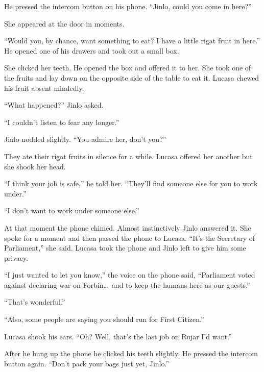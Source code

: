 He pressed the intercom button on his phone. ``Jinlo, could you come in here?''

She appeared at the door in moments.

``Would you, by chance, want something to eat? I have a little rigat fruit in here.'' He opened
one of his drawers and took out a small box.

She clicked her teeth. He opened the box and offered it to her. She took one of the fruits and
lay down on the opposite side of the table to eat it. Lucasa chewed his fruit absent mindedly.

``What happened?'' Jinlo asked.

``I couldn't listen to fear any longer.''

Jinlo nodded slightly. ``You admire her, don't you?''

They ate their rigat fruits in silence for a while. Lucasa offered her another but she shook her
head.

``I think your job is safe,'' he told her. ``They'll find someone else for you to work under.''

``I don't want to work under someone else.''

At that moment the phone chimed. Almost instinctively Jinlo answered it. She spoke for a moment
and then passed the phone to Lucasa. ``It's the Secretary of Parliament,'' she said. Lucasa took
the phone and Jinlo left to give him some privacy.

``I just wanted to let you know,'' the voice on the phone said, ``Parliament voted against
declaring war on Forbin\ldots\ and to keep the humans here as our guests.''

``That's wonderful.''

``Also, some people are saying you should run for First Citizen.''

Lucasa shook his ears. ``Oh? Well, that's the last job on Rujar I'd want.''

After he hung up the phone he clicked his teeth slightly. He pressed the intercom button again.
``Don't pack your bags just yet, Jinlo.''
